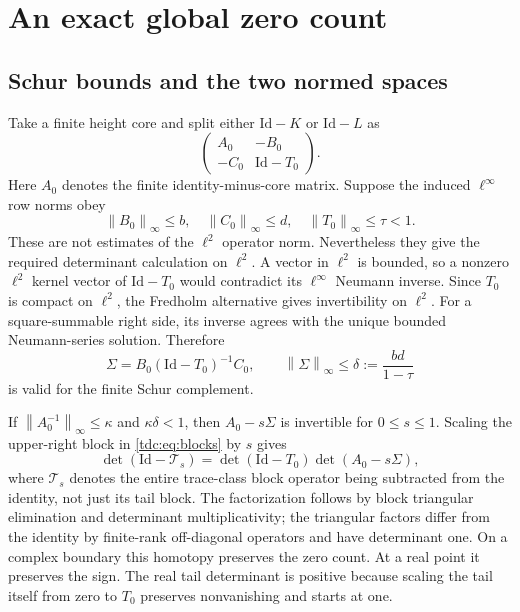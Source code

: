 \documentclass[11pt]{article}
\theoremstyle{definition}\newtheorem{definition}[theorem]{Definition}
\theoremstyle{remark}\newtheorem{remark}[theorem]{Remark}
\newcommand{\Id}{\mathrm{Id}}
\newcommand{\norm}[1]{\left\lVert#1\right\rVert}
\begin{document}
\section{An exact global zero count}
\label{tdc:sec:global}
\subsection{Schur bounds and the two normed spaces}
Take a finite height core and split either $\Id-K$ or $\Id-L$ as
\begin{equation}\label{tdc:eq:blocks}
 \begin{pmatrix}A_0&-B_0\\-C_0&\Id-T_0\end{pmatrix}.
\end{equation}
Here $A_0$ denotes the finite identity-minus-core matrix. Suppose the induced $\ell^\infty$ row norms obey
\[
 \norm{B_0}_\infty\le b,\quad \norm{C_0}_\infty\le d,
 \quad\norm{T_0}_\infty\le\tau<1.
\]
These are not estimates of the $\ell^2$ operator norm. Nevertheless they give the required determinant calculation on $\ell^2$. A vector in $\ell^2$ is bounded, so a nonzero $\ell^2$ kernel vector of $\Id-T_0$ would contradict its $\ell^\infty$ Neumann inverse. Since $T_0$ is compact on $\ell^2$, the Fredholm alternative gives invertibility on $\ell^2$. For a square-summable right side, its inverse agrees with the unique bounded Neumann-series solution. Therefore
\begin{equation}\label{tdc:eq:schur}
 \Sigma=B_0(\Id-T_0)^{-1}C_0,
 \qquad\norm{\Sigma}_\infty\le\delta:=\frac{bd}{1-\tau}
\end{equation}
is valid for the finite Schur complement.

If $\norm{A_0^{-1}}_\infty\le\kappa$ and $\kappa\delta<1$, then $A_0-s\Sigma$ is invertible for $0\le s\le1$. Scaling the upper-right block in \eqref{tdc:eq:blocks} by $s$ gives
\begin{equation}\label{tdc:eq:fredholmschur}
 \det(\Id-\mathcal T_s)=\det(\Id-T_0)\det(A_0-s\Sigma),
\end{equation}
where $\mathcal T_s$ denotes the entire trace-class block operator being subtracted from the identity, not just its tail block. The factorization follows by block triangular elimination and determinant multiplicativity; the triangular factors differ from the identity by finite-rank off-diagonal operators and have determinant one. On a complex boundary this homotopy preserves the zero count. At a real point it preserves the sign. The real tail determinant is positive because scaling the tail itself from zero to $T_0$ preserves nonvanishing and starts at one.
\end{document}
